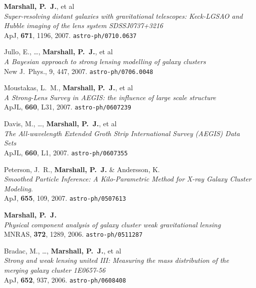 \begin{revnumerate}
\item{\textbf{{Marshall}, P.~J.}, et al\\
\textit{Super-resolving distant galaxies with gravitational telescopes: Keck-LGSAO and Hubble imaging of the lens system SDSSJ0737+3216}\\
ApJ, \textbf{671}, 1196, 2007.
\texttt{astro-ph/0710.0637}}

\item{Jullo, E., \ldots, \textbf{{Marshall}, P.~J.}, et al\\
\textit{A Bayesian approach to strong lensing modelling of galaxy clusters}\\
New J.\ Phys., 9, 447, 2007.
\texttt{astro-ph/0706.0048}
}

\item{Moustakas, L.~M., \textbf{{Marshall}, P.~J.}, et al\\
\textit{A Strong-Lens Survey in AEGIS: the influence of large scale structure}\\
ApJL, \textbf{660}, L31, 2007.
\texttt{astro-ph/0607239}
}

\item{Davis, M., \ldots, \textbf{{Marshall}, P.~J.}, et al\\
\textit{The All-wavelength Extended Groth Strip International Survey (AEGIS) Data Sets}\\
ApJL, \textbf{660}, L1, 2007.
\texttt{astro-ph/0607355}
}

\item{{Peterson}, J.~R., \textbf{{Marshall}, P.~J.} \& {Andersson}, K.\\
\textit{Smoothed Particle Inference: A Kilo-Parametric Method for X-ray Galaxy Cluster Modeling}.\\
ApJ, \textbf{655}, 109, 2007.
\texttt{astro-ph/0507613}
}

\item{\textbf{{Marshall}, P.~J.}\\
\textit{Physical component analysis of galaxy cluster weak gravitational lensing}\\
MNRAS, \textbf{372}, 1289, 2006.
\texttt{astro-ph/0511287}
}

\item{Bradac, M., \ldots, \textbf{{Marshall}, P.~J.}, et al\\
\textit{Strong and weak lensing united III: Measuring the mass distribution of the  merging galaxy cluster 1E0657-56}\\
ApJ, \textbf{652}, 937, 2006.
\texttt{astro-ph/0608408}
}


\end{revnumerate}

